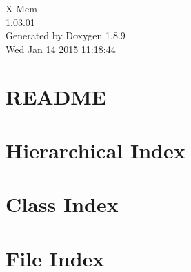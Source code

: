\documentclass[twoside]{book}
\newcommand{\+}{\discretionary{\mbox{\scriptsize$\hookleftarrow$}}{}{}}
\newcommand{\clearemptydoublepage}{%
  \newpage{\pagestyle{empty}\cleardoublepage}%
}
\begin{document}
\hypersetup{pageanchor=false,
             bookmarks=true,
             bookmarksnumbered=true,
             pdfencoding=unicode
            }
\begin{titlepage}
\vspace*{7cm}
\begin{center}%
{\Large X-\/\+Mem \\[1ex]\large 1.\+03.\+01 }\\
\vspace*{1cm}
{\large Generated by Doxygen 1.8.9}\\
\vspace*{0.5cm}
{\small Wed Jan 14 2015 11:18:44}\\
\end{center}
\end{titlepage}
\clearemptydoublepage
\tableofcontents
\clearemptydoublepage
{}
\hypersetup{pageanchor=true}

\chapter{R\+E\+A\+D\+M\+E}
\label{md_src__r_e_a_d_m_e}
\hypertarget{md_src__r_e_a_d_m_e}{}

\chapter{Hierarchical Index}

\chapter{Class Index}

\chapter{File Index}

\end{document}
